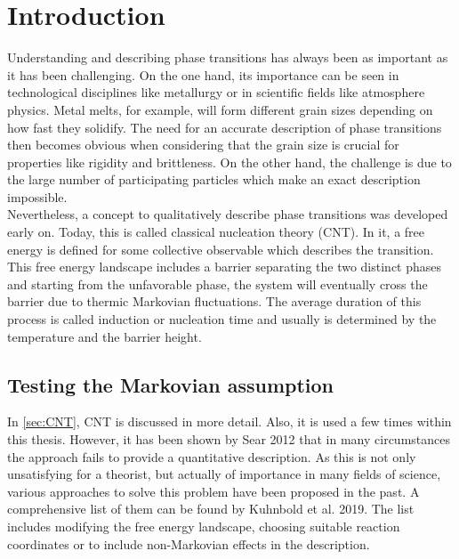 
\label{chp:theory}

\section{Introduction}
\label{sec:memory_approach}
Understanding and describing phase transitions has always been as important as it has been challenging. On the one hand, its importance can be seen in technological disciplines like metallurgy or in scientific fields like atmosphere physics. Metal melts, for example, will form different grain sizes depending on how fast they solidify. The need for an accurate description of phase transitions then becomes obvious when considering that the grain size is crucial for properties like rigidity and brittleness. On the other hand, the challenge is due to the large number of participating particles which make an exact description impossible.\\

Nevertheless, a concept to qualitatively describe phase transitions was developed early on. Today, this is called classical nucleation theory (CNT). In it, a free energy is defined for some collective observable which describes the transition. This free energy landscape includes a barrier separating the two distinct phases and starting from the unfavorable phase, the system will eventually cross the barrier due to thermic Markovian fluctuations. The average duration of this process is called induction or nucleation time and usually is determined by the temperature and the barrier height.\\

\subsection{Testing the Markovian assumption}
In \autoref{sec:CNT}, CNT is discussed in more detail. Also, it is used a few times within this thesis. However, it has been shown by Sear 2012\cite{Sear2012} that in many circumstances the approach fails to provide a quantitative description. As this is not only unsatisfying for a theorist, but actually of importance in many fields of science, various approaches to solve this problem have been proposed in the past. A comprehensive list of them can be found by Kuhnbold et al. 2019\cite{Kuhnbold2019}. The list includes modifying the free energy landscape, choosing suitable reaction coordinates or to include non-Markovian effects in the description.\\ 

